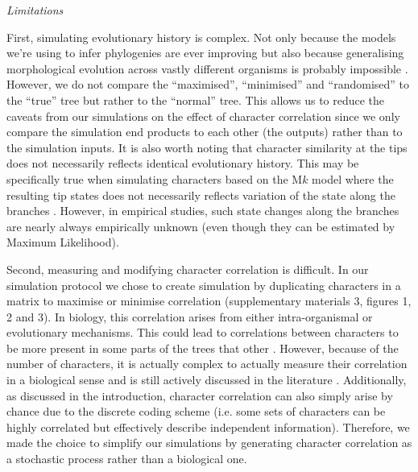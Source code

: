 \documentclass[12pt,letterpaper]{article}
\renewcommand{\subsection}[1]{%
\bigskip
\begin{center}
\begin{large}
\normalfont\itshape #1
\end{large}
\end{center}}
\begin{document}
\subsection{Limitations}
First, simulating evolutionary history is complex.
Not only because the models we're using to infer phylogenies are ever improving \citep[e.g.][]{heath2014fossilized,Wright01072016} but also because generalising morphological evolution across vastly different organisms is probably impossible \citep[see constrasted discussions from][]{GoloboffEmpirical,OReillyEmpirical}.
However, we do not compare the ``maximised'', ``minimised'' and ``randomised'' to the ``true'' tree but rather to the ``normal'' tree.
This allows us to reduce the caveats from our simulations on the effect of character correlation since we only compare the simulation end products to each other (the outputs) rather than to the simulation inputs.
It is also worth noting that character similarity at the tips does not necessarily reflects identical evolutionary history.
This may be specifically true when simulating characters based on the M$k$ model where the resulting tip states does not necessarily reflects variation of the state along the branches \citep[e.g.][]{revell2014ancestral}.
However, in empirical studies, such state changes along the branches are nearly always empirically unknown (even though they can be estimated by Maximum Likelihood).
 
Second, measuring and modifying character correlation is difficult. 
In our simulation protocol we chose to create simulation by duplicating characters in a matrix to maximise or minimise correlation (supplementary materials 3, figures 1, 2 and 3).
In biology, this correlation arises from either intra-organismal or evolutionary mechanisms.
This could lead to correlations between characters to be more present in some parts of the trees that other \citep[e.g. in the case of inapplicable data ][]{BrazeauNA}.
However, because of the number of characters, it is actually complex to actually measure their correlation in a biological sense and is still actively discussed in the literature \citep{Lande1983,Maddison1990,Pagel1994,Pagel2006,goswami2006morphological,goswami2010,goswami2014macroevolutionary,Grabowski2016}.
Additionally, as discussed in the introduction, character correlation can also simply arise by chance due to the discrete coding scheme (i.e. some sets of characters can be highly correlated but effectively describe independent information).
Therefore, we made the choice to simplify our simulations by generating character correlation as a stochastic process rather than a biological one.
\end{document}
